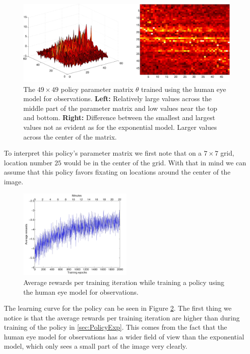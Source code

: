\begin{figure}[!htp]
  \centering
  \includegraphics[width=1\textwidth]{figures/eye_policy_theta}
  \caption{The $49 \times 49$ policy parameter matrix $\theta$ trained using the human eye model for observations. \textbf{Left:} Relatively large values across the middle part of the parameter matrix and low values near the top and bottom. \textbf{Right:} Difference between the smallest and largest values not as evident as for the exponential model. Larger values across the center of the matrix.}
  \label{fig:EyePolicyTheta}
\end{figure}
\FloatBarrier

\noindent
To interpret this policy's parameter matrix we first note that on a $7 \times 7$ grid, location number $25$ would be in the center of the grid. With that in mind we can assume that this policy favors fixating on locations around the center of the image.

\begin{figure}[!htp]
  \centering
  \includegraphics[width=0.5\textwidth]{figures/average_rewards_eye_2x}
  \caption{Average rewards per training iteration while training a policy using the human eye model for observations.}
  \label{fig:AverageRewardsEye}
\end{figure}

\noindent
The learning curve for the policy can be seen in Figure \ref{fig:AverageRewardsEye}. The first thing we notice is that the average rewards per training iteration are higher than during training of the policy in \ref{sec:PolicyExp}. This comes from the fact that the human eye model for observations has a wider field of view than the exponential model, which only sees a small part of the image very clearly.

